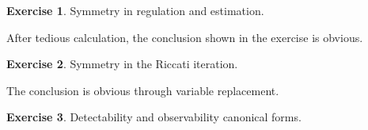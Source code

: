 \documentclass[11pt,a4paper]{report}
\theoremstyle{definition}\newtheorem{exercise}{Exercise}[chapter]
\begin{document}
\begin{exercise}Symmetry in regulation and estimation.\\
\end{exercise}
\begin{answer}
After tedious calculation, the conclusion shown in the exercise is obvious.
\end{answer}


\begin{exercise}Symmetry in the Riccati iteration.\\
\end{exercise}
\begin{answer}
    The conclusion is obvious through variable replacement.
\end{answer}


\begin{exercise}Detectability and observability canonical forms.\\
\end{exercise}
\begin{answer}

\end{answer}























\end{document}
